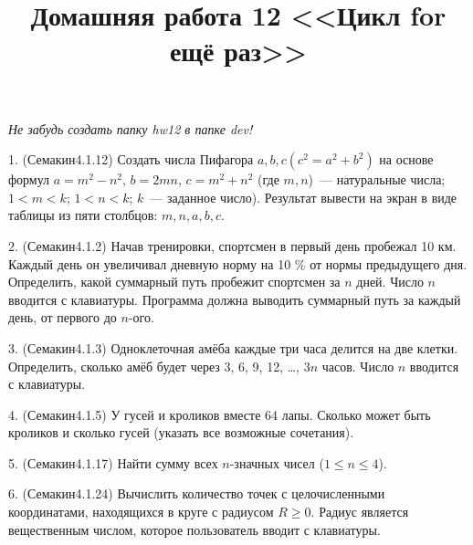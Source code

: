 \documentclass[a4paper,12pt,draft]{article}
\title{Домашняя работа 12 <<Цикл for ещё раз>>}
\date{}
\begin{document}
\maketitle{}

\emph{Не забудь создать папку hw12 в папке dev!}

1. (Семакин4.1.12) Создать числа Пифагора $a, b, c (c^2 = a^2 + b^2)$ на
основе формул $a = m^2 - n^2$, $b = 2mn$, $c = m^2 + n^2$ (где $m, n$)~---
натуральные числа; $1 < m < k$; $1 < n < k$; $k$~--- заданное число). Результат
вывести на экран в виде таблицы из пяти столбцов: $m, n, a, b, c$.

2. (Семакин4.1.2) Начав тренировки, спортсмен в первый день пробежал 10 км.
Каждый день он увеличивал дневную норму на 10 \% от нормы предыдущего дня.
Определить, какой суммарный путь пробежит спортсмен за $n$ дней. Число $n$
вводится с клавиатуры. Программа должна выводить суммарный путь за каждый
день, от первого до $n$-ого.

3. (Семакин4.1.3) Одноклеточная амёба каждые три часа делится на две клетки.
Определить, сколько амёб будет через 3, 6, 9, 12, \dots, $3n$ часов. Число $n$
вводится с клавиатуры.

4. (Семакин4.1.5) У гусей и кроликов вместе 64 лапы. Сколько может быть
кроликов и сколько гусей (указать все возможные сочетания).

5. (Семакин4.1.17) Найти сумму всех $n$-значных чисел ($1 \leq n \leq 4$).

6. (Семакин4.1.24) Вычислить количество точек с целочисленными координатами,
находящихся в круге с радиусом $R \geq 0 $. Радиус является вещественным
числом, которое пользователь вводит с клавиатуры.
\end{document}
